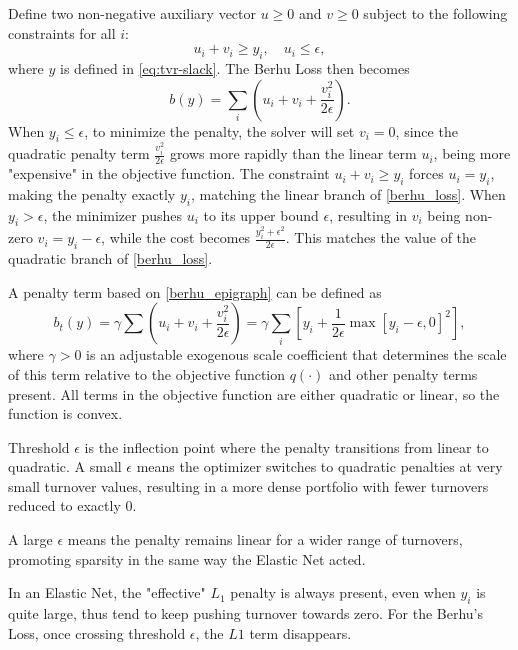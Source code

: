 \documentclass[11pt, letterpaper]{article}
\begin{document}
Define two non-negative auxiliary vector $u \geq 0$ and $v \geq 0$ subject to the following constraints for all $i$:
\begin{equation*}
	u_i + v_i \geq y_i, \quad u_i \leq \epsilon,
\end{equation*}
where $y$ is defined in \eqref{eq:tvr-slack}. The Berhu Loss then becomes
\begin{equation}
    \label{berhu_epigraph}
	b(y) = \sum_i \left(u_i + v_i + \frac{v_i^2}{2\epsilon}\right).
\end{equation}
When $y_i \leq \epsilon$, to minimize the penalty, the solver will set $v_i = 0$, since the quadratic penalty term
$\frac{v_i^2}{2\epsilon}$ grows more rapidly than the linear term $u_i$, being more "expensive" in the objective function. The
constraint $u_i + v_i \geq y_i$ forces $u_i = y_i$, making the penalty exactly $y_i$, matching the linear branch of
\eqref{berhu_loss}. When $y_i > \epsilon$, the minimizer pushes $u_i$ to its upper bound $\epsilon$, resulting in $v_i$ being
non-zero $v_i = y_i - \epsilon$, while the cost becomes $\frac{y_i^2 + \epsilon ^ 2}{2\epsilon}$. This matches the value of the
quadratic branch of \eqref{berhu_loss}.

A penalty term based on \eqref{berhu_epigraph} can be defined as
\begin{equation}
	b_t(y) = \gamma \sum \left(u_i + v_i + \frac{v_i^2}{2\epsilon}\right) = \gamma \sum_i{\left[y_i + \frac{1}{2\epsilon}\max[y_i - \epsilon, 0]^2\right]},
\end{equation}
where $\gamma > 0$ is an adjustable exogenous scale coefficient that determines the scale of this term relative to the objective
function $q(\cdot)$ and other penalty terms present. All terms in the objective function are either quadratic or linear, so the
function is convex.

Threshold $\epsilon$ is the inflection point where the penalty transitions from linear to quadratic. A small $\epsilon$ means
the optimizer switches to quadratic penalties at very small turnover values, resulting in a more dense portfolio with fewer
turnovers reduced to exactly $0$.

A large $\epsilon$ means the penalty remains linear for a wider range of turnovers, promoting sparsity in the same way the Elastic Net acted.

In an Elastic Net, the "effective" $L_1$ penalty is always present, even when $y_i$ is quite large, thus tend to keep pushing
turnover towards zero. For the Berhu's Loss, once crossing threshold $\epsilon$, the $L1$ term disappears.
\end{document}
